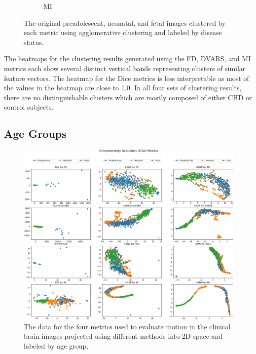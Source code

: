\begin{figure}
\begin{subfigure}{0.45\textwidth}
		\caption{MI}
	\end{subfigure}
\vspace{-10mm}
\caption{The original preadolescent, neonatal, and fetal images clustered by each metric using agglomerative clustering and labeled by disease status.}
\label{fig:mocha-cohorts-sns-agg}
\end{figure}

The heatmaps for the clustering results generated using the FD, DVARS, and MI metrics each show several distinct vertical bands representing clusters of similar feature vectors. The heatmap for the Dice metrics is less interpretable as most of the values in the heatmap are close to 1.0. In all four sets of clustering results, there are no distinguishable clusters which are mostly composed of either CHD or control subjects.

\subsection{Age Groups}

\begin{figure}
\centering
\includegraphics[width=1.0\textwidth]{6/figures/bold-2d-all-agegroup.png}
\caption{The data for the four metrics used to evaluate motion in the clinical brain images projected using different methods into 2D space and labeled by age group.}
\label{fig:mocha-ages-data-2d}
\end{figure}

